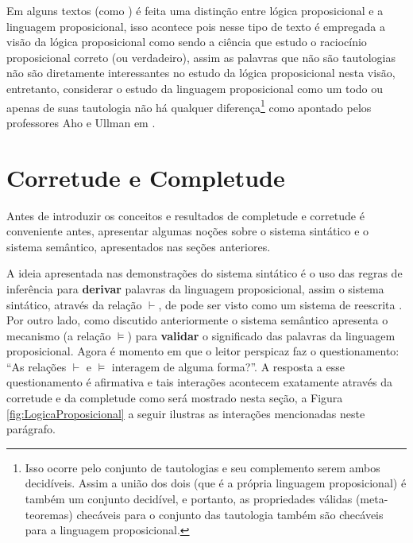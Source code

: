 Em alguns textos (como \cite{BenjaV1}) é feita uma distinção entre lógica proposicional e a linguagem proposicional, isso acontece pois nesse tipo de texto é empregada a visão da lógica proposicional como sendo a ciência que estudo o raciocínio proposicional correto (ou verdadeiro), assim as palavras que não são tautologias não são diretamente interessantes no estudo da lógica proposicional nesta visão, entretanto, considerar o estudo da linguagem proposicional como um todo ou apenas de suas tautologia não há qualquer diferença\footnote{Isso ocorre pelo conjunto de tautologias e seu complemento serem ambos decidíveis. Assim a união dos dois (que é a própria linguagem proposicional) é também um conjunto decidível, e portanto, as propriedades válidas (meta-teoremas) checáveis para o conjunto das tautologia também são checáveis para a linguagem proposicional.} como apontado pelos professores Aho e Ullman em \cite{ullman1992}.

\section{Corretude e Completude}

Antes de introduzir os conceitos e resultados de completude e corretude é conveniente antes, apresentar algumas noções sobre o sistema sintático e o sistema semântico, apresentados nas seções anteriores. 

A ideia apresentada nas demonstrações do sistema sintático é o uso das regras de inferência para \textbf{derivar} palavras da linguagem proposicional, assim o sistema sintático, através da relação $\vdash$, de pode ser visto como um sistema de reescrita \cite{ayala2014}. Por outro lado, como discutido anteriormente o sistema semântico apresenta o mecanismo (a relação $\vDash$) para \textbf{validar} o significado das palavras da linguagem proposicional. Agora é momento em que o leitor perspicaz faz o questionamento: ``As relações $\vdash$ e $\vDash$ interagem de alguma forma?''. A resposta a esse questionamento é afirmativa e tais interações acontecem exatamente através da corretude e da completude como será mostrado nesta seção, a Figura \ref{fig:LogicaProposicional} a seguir ilustras as interações mencionadas neste parágrafo.

